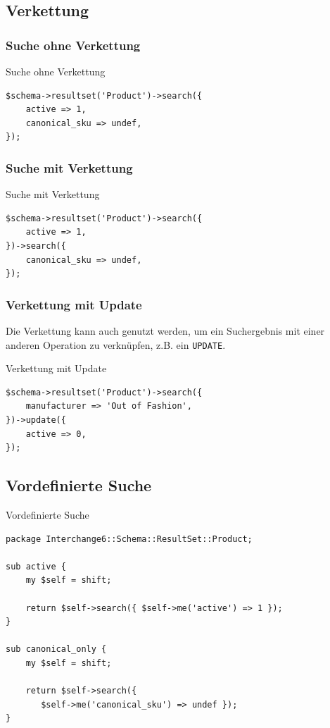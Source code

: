 \subsection{Verkettung}

\subsubsection{Suche ohne Verkettung}

\begin{frame}[fragile]{Suche ohne Verkettung}
\begin{lstlisting}
$schema->resultset('Product')->search({
    active => 1,
    canonical_sku => undef,
});
\end{lstlisting}
\end{frame}

\subsubsection{Suche mit Verkettung}

\begin{frame}[fragile]{Suche mit Verkettung}
\begin{lstlisting}
$schema->resultset('Product')->search({
    active => 1,
})->search({
    canonical_sku => undef,
});
\end{lstlisting}
\end{frame}

\subsubsection{Verkettung mit Update}

Die Verkettung kann auch genutzt werden, um
ein Suchergebnis mit einer anderen Operation zu
verknüpfen, z.B. ein \verb|UPDATE|.

\begin{frame}[fragile]{Verkettung mit Update}
\begin{lstlisting}
$schema->resultset('Product')->search({
    manufacturer => 'Out of Fashion',
})->update({
    active => 0,
});
\end{lstlisting}
\end{frame}

\subsection{Vordefinierte Suche}

\begin{frame}[fragile]{Vordefinierte Suche}
\begin{lstlisting}
package Interchange6::Schema::ResultSet::Product;

sub active {
    my $self = shift;

    return $self->search({ $self->me('active') => 1 });
}

sub canonical_only {
    my $self = shift;

    return $self->search({ 
       $self->me('canonical_sku') => undef });
}

\end{lstlisting}
\end{frame}

